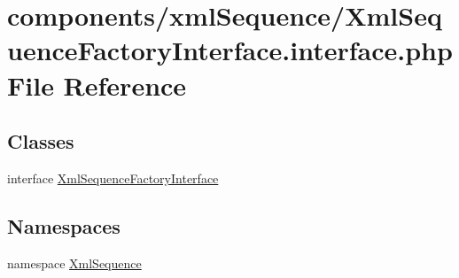 \hypertarget{_xml_sequence_factory_interface_8interface_8php}{
\section{components/xmlSequence/XmlSequenceFactoryInterface.interface.php File Reference}
\label{_xml_sequence_factory_interface_8interface_8php}
}
\subsection*{Classes}
\begin{CompactItemize}
\item 
interface \hyperlink{interface_xml_sequence_factory_interface}{XmlSequenceFactoryInterface}
\end{CompactItemize}
\subsection*{Namespaces}
\begin{CompactItemize}
\item 
namespace \hyperlink{namespace_xml_sequence}{XmlSequence}
\end{CompactItemize}
